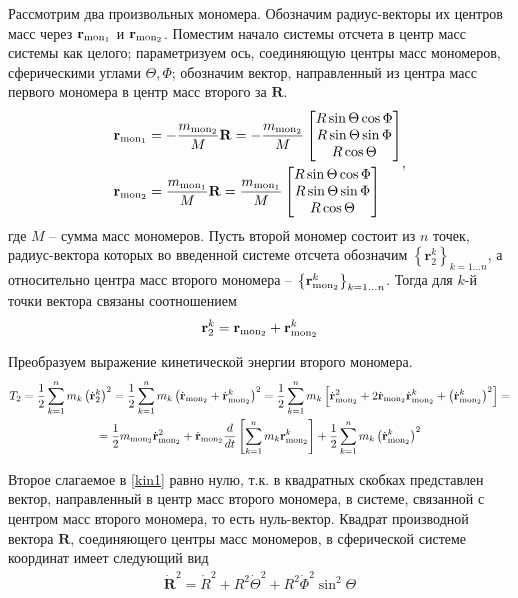 \documentclass[14pt]{extarticle}
\newcommand{\dvr}{\dot{\mathbf{r}}}
\newcommand{\vr}{\mathbf{r}}
\newcommand{\vR}{\mathbf{R}}
\newcommand{\dvR}{\dot{\mathbf{R}}}
\newcommand{\mmf}{m_{\textup{mon}_1}}
\newcommand{\mms}{m_{\textup{mon}_2}}
\newcommand{\vrmf}{\mathbf{r}_{\textup{mon}_1}}
\newcommand{\vrms}{\mathbf{r}_{\textup{mon}_2}}
\newcommand{\dvrms}{\dot{\mathbf{r}}_{\textup{mon}_2}}
\newcommand{\dR}{\dot{R}}
\newcommand{\dTheta}{\dot{\Theta}}
\newcommand{\dPhi}{\dot{\Phi}}
\newcommand{\lb}{\left(}
\newcommand{\rb}{\right)}
\begin{document}
Рассмотрим два произвольных мономера. Обозначим радиус-векторы их центров масс через $\vrmf$ и $\vrms$. Поместим начало системы отсчета в центр масс системы как целого; параметризуем ось, соединяющую центры масс мономеров, сферическими углами $\Theta, \Phi$; обозначим вектор, направленный из центра масс первого мономера в центр масс второго за $\vR$. 
\begin{gather}
	\begin{aligned}
		\vrmf &= - \frac{\mms}{M} \vR = -\frac{\mms}{M} \begin{bmatrix} R \sin \Theta \cos  \Phi \\ R \sin \Theta \sin \Phi \\ R \cos \Theta \end{bmatrix} \\
		\vrms &= \frac{\mmf}{M} \vR = \frac{\mmf}{M} \begin{bmatrix} R \sin \Theta \cos \Phi \\ R \sin \Theta \sin \Phi \\ R \cos \Theta \end{bmatrix}
	\end{aligned},  \label{com_mon}
\end{gather}
где $M$ -- сумма масс мономеров. Пусть второй мономер состоит из $n$ точек, радиус-вектора которых во введенной системе отсчета обозначим $\left\{ \vr_2^k \right\}_{k = 1 \dots n}$, а относительно центра масс второго мономера -- $\left\{ \vrms^k \right\}_{k = 1 \dots n}$. Тогда для $k$-й точки вектора связаны соотношением
\begin{gather}
	\vr_2^k = \vrms + \vrms^k 
\end{gather}

Преобразуем выражение кинетической энергии второго мономера.
\begin{gather}
		T_2 = \frac{1}{2} \sum_{k = 1}^n m_k \lb \dvr_2^k \rb^2 = \frac{1}{2} \sum_{k = 1}^n m_k \lb \dvrms + \dvrms^k \rb^2 = \frac{1}{2} \sum_{k=1}^n m_k \left[ \dvrms^2 + 2 \dvrms \dvrms^k + \lb  \dvrms^k \rb^2 \right] = \notag \\
		= \frac{1}{2} \mms \dvrms^2 + \dvrms \frac{d}{dt} \left[ \sum_{k=1}^n m_k \vrms^k \right] + \frac{1}{2} \sum_{k=1}^n m_k \lb \dvrms^k \rb^2 \label{kin1}
\end{gather}

Второе слагаемое в \eqref{kin1} равно нулю, т.к. в квадратных скобках представлен вектор, направленный в центр масс второго мономера, в системе, связанной с центром масс второго мономера, то есть нуль-вектор. Квадрат производной вектора $\vR$, соединяющего центры масс мономеров, в сферической системе координат имеет следующий вид
\begin{gather}
	\dvR^2 = \dR^2 + R^2 \dTheta^2 + R^2 \dPhi^2 \sin^2 \Theta \label{der}
\end{gather}
\end{document}
